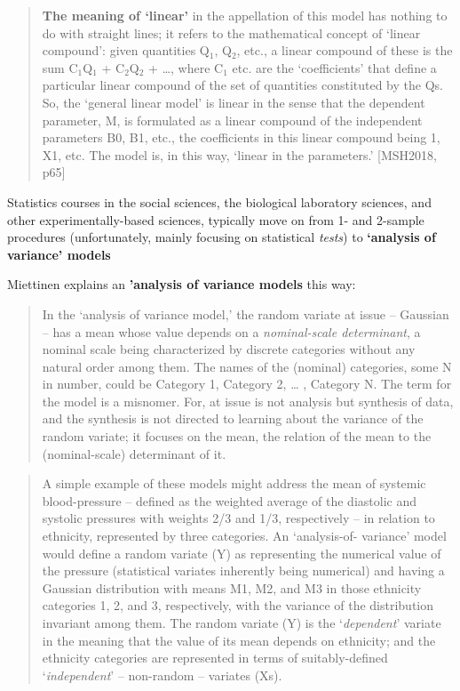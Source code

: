 \documentclass[]{book}
\begin{document}
\begin{quote}
\textbf{The meaning of `linear'} in the appellation of this model has nothing to do with straight lines; it refers to the mathematical concept of `linear compound': given quantities Q\(_1\), Q\(_2\), etc., a linear compound of these is the sum C\(_1\)Q\(_1\) + C\(_2\)Q\(_2\) + \ldots{}, where C\(_1\) etc. are the `coefficients' that define a particular linear compound of the set of quantities constituted by the Qs.
So, the `general linear model' is linear in the sense that the dependent parameter, M, is formulated as a linear compound of the independent parameters B0, B1, etc., the coefficients in this linear compound being 1, X1, etc. The model is, in this way, `linear in the parameters.' {[}MSH2018, p65{]}
\end{quote}

Statistics courses in the social sciences, the biological laboratory sciences, and other experimentally-based sciences, typically move on from 1- and 2-sample procedures (unfortunately, mainly focusing on statistical \emph{tests}) to \textbf{`analysis of variance' models}

Miettinen explains an \textbf{'analysis of variance models} this way:

\begin{quote}
In the `analysis of variance model,' the random variate at issue -- Gaussian -- has a mean whose value depends on a \emph{nominal-scale determinant}, a nominal scale being characterized by discrete categories without any natural order among them. The names of the (nominal) categories, some N in number, could be Category 1, Category 2, \ldots{} , Category N. The term for the model is a misnomer. For, at issue is not analysis but synthesis of data, and the synthesis is not directed to learning about the variance of the random variate; it focuses on the mean, the relation of the mean to the (nominal-scale) determinant of it.
\end{quote}

\begin{quote}
A simple example of these models might address the mean of systemic blood-pressure -- defined as the weighted average of the diastolic and systolic pressures with weights 2/3 and 1/3, respectively -- in relation to ethnicity, represented by three categories. An `analysis-of- variance' model would define a random variate (Y) as representing the numerical value of the pressure (statistical variates inherently being numerical) and having a Gaussian distribution with means M1, M2, and M3 in those ethnicity categories 1, 2, and 3, respectively, with the variance of the distribution invariant among them. The random variate (Y) is the `\emph{dependent}' variate in the meaning that the value of its mean depends on ethnicity; and the ethnicity categories are represented in terms of suitably-defined `\emph{independent}' -- non-random -- variates (Xs).
\end{quote}
\end{document}
